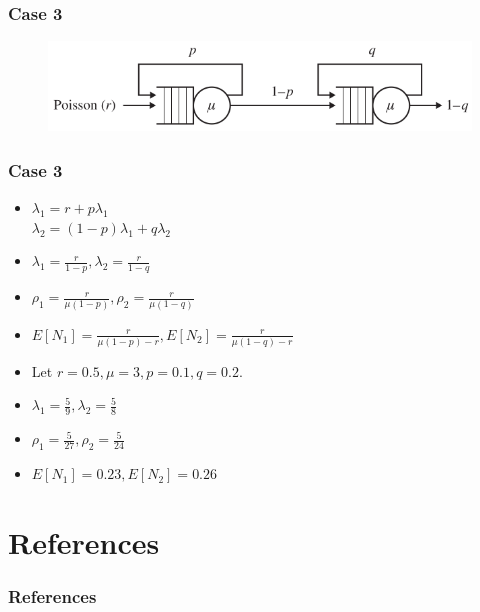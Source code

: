 \documentclass[10pt,notes]{beamer}
\begin{document}
\begin{frame}
    \frametitle{Case 3}
    \begin{figure}
        \includegraphics[width=0.75\linewidth]{images/case3.png}
    \end{figure}
\end{frame}

\begin{frame}
    \frametitle{Case 3}
    \begin{itemize}
        \item $\lambda_1 = r + p\lambda_1$ \\
            $\lambda_2 = (1 - p)\lambda_1 + q\lambda_2$ \\
        \item $\lambda_1 = \frac{r}{1 - p}, \lambda_2 = \frac{r}{1 - q}$
        \item $\rho_1 = \frac{r}{\mu(1 - p)}, \rho_2 = \frac{r}{\mu(1 - q)}$
        \item $E[N_1] = \frac{r}{\mu(1 - p) - r}, E[N_2] = \frac{r}{\mu(1 - q) - r}$
        \item Let $r = 0.5, \mu = 3, p = 0.1, q = 0.2$.
        \item $\lambda_1 = \frac{5}{9}, \lambda_2 = \frac{5}{8}$
        \item $\rho_1 = \frac{5}{27}, \rho_2 = \frac{5}{24}$
        \item $E[N_1] = 0.23, E[N_2] = 0.26$
    \end{itemize}
\end{frame}

\section{References}

\begin{frame}
    \frametitle{References}
    \nocite{*}
    \printbibliography
\end{frame}
\end{document}
